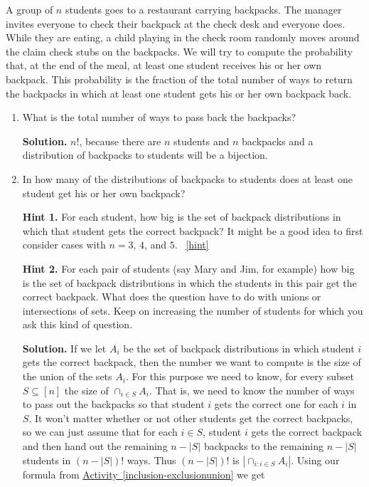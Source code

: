 \documentclass{book}
\begin{document}
\setcounter{project}{222}
\addtocounter{project}{-1}
\begin{activity}[]\label{hatcheck}
\hypertarget{p-1199}{}%
A group of \(n\) students goes to a restaurant carrying backpacks. The manager invites everyone to check their backpack at the check desk and everyone does. While they are eating, a child playing in the check room randomly moves around the claim check stubs on the backpacks. We will try to compute the probability that, at the end of the meal, at least one student receives his or her own backpack.  This probability is the fraction of the total number of ways to return the backpacks in which at least one student gets his or her own backpack back.%
\begin{enumerate}[font=\bfseries,label=(\alph*),ref=\alph*]
\item\label{task-227} \hypertarget{p-1200}{}%
What is the total number of ways to pass back the backpacks?%
\par\smallskip%
\noindent\textbf{Solution.}\hypertarget{solution-119}{}\quad%
\hypertarget{p-1201}{}%
\(n!\), because there are \(n\) students and \(n\) backpacks and a distribution of backpacks to students will be a bijection.%
\item\label{task-228} \hypertarget{p-1202}{}%
In how many of the distributions of backpacks to students does at least one student get his or her own backpack?%
\par\smallskip%
\noindent\textbf{Hint 1.}\hypertarget{hint-141}{}\quad%
\hypertarget{p-1203}{}%
For each student, how big is the set of backpack distributions in which that student gets the correct backpack?  It might be a good idea to first consider cases with \(n=3\), \(4\), and \(5\).%
~\hfill{\tiny\hyperlink{a-222.b}{[hint]}\hypertarget{q-222.b}{}}\par\smallskip%
\noindent\textbf{Hint 2.}\hypertarget{hint-142}{}\quad%
\hypertarget{p-1204}{}%
For each pair of students (say Mary and Jim, for example) how big is the set of backpack distributions in which the students in this pair get the correct backpack. What does the question have to do with unions or intersections of sets. Keep on increasing the number of students for which you ask this kind of question.%
\par\smallskip%
\noindent\textbf{Solution.}\hypertarget{solution-120}{}\quad%
\hypertarget{p-1205}{}%
If we let \(A_i\) be the set of backpack distributions in which student \(i\) gets the correct backpack, then the number we want to compute is the size of the union of the sets \(A_i\). For this purpose we need to know, for every subset \(S\subseteq [n]\) the size of \(\cap_{i\in S}A_i\). That is, we need to know the number of ways to pass out the backpacks so that student \(i\) gets the correct one for each \(i\) in \(S\). It won't matter whether or not other students get the correct backpacks, so we can just assume that for each \(i\in S\), student \(i\) gets the correct backpack and then hand out the remaining \(n-|S|\) backpacks to the remaining \(n-|S|\) students in \((n-|S|)!\) ways. Thus \((n-|S|)!\) is \(|\cap_{i:i\in S}A_i|\). Using our formula from \hyperref[inclusion-exclusionunion]{Activity~\ref{inclusion-exclusionunion}} we get%

\end{enumerate}
\end{activity}
\end{document}
